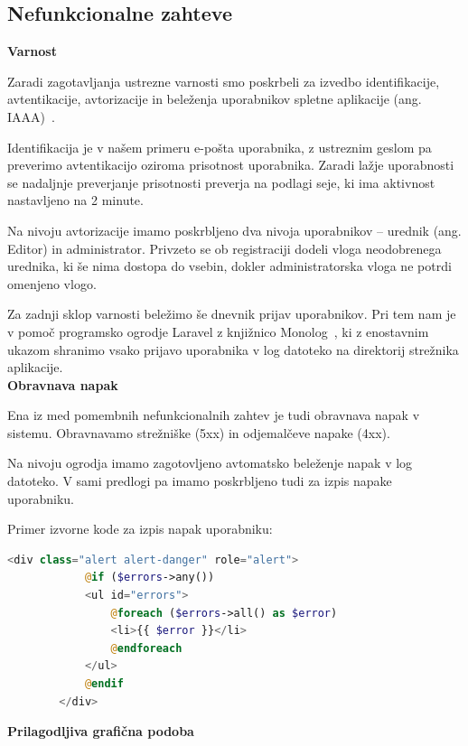 \documentclass[a4paper, 12pt]{book}
\begin{document}
\subsection{Nefunkcionalne zahteve}

\noindent \textbf{Varnost}

Zaradi zagotavljanja ustrezne varnosti smo poskrbeli za izvedbo identifikacije, avtentikacije, avtorizacije in beleženja uporabnikov spletne aplikacije (ang. IAAA)~\cite{IAAA-security}.

Identifikacija je v našem primeru e-pošta uporabnika, z ustreznim geslom pa preverimo avtentikacijo oziroma prisotnost uporabnika. Zaradi lažje uporabnosti se nadaljnje preverjanje prisotnosti preverja na podlagi seje, ki ima aktivnost nastavljeno na 2 minute. 

Na nivoju avtorizacije imamo poskrbljeno dva nivoja uporabnikov – urednik (ang. Editor) in administrator. Privzeto se ob registraciji dodeli vloga neodobrenega urednika, ki še nima dostopa do vsebin, dokler administratorska vloga ne potrdi omenjeno vlogo.

Za zadnji sklop varnosti beležimo še dnevnik prijav uporabnikov. Pri tem nam je v pomoč programsko ogrodje Laravel z knjižnico Monolog~\cite{laravel-monolog}, ki z enostavnim ukazom shranimo vsako prijavo uporabnika v log datoteko na direktorij strežnika aplikacije. \\

\noindent \textbf{Obravnava napak}

Ena iz med pomembnih nefunkcionalnih zahtev je tudi obravnava napak v sistemu. Obravnavamo strežniške (5xx) in odjemalčeve napake (4xx). 


Na nivoju ogrodja imamo zagotovljeno avtomatsko beleženje napak v log datoteko. V sami predlogi pa imamo poskrbljeno tudi za izpis napake uporabniku.

Primer izvorne kode za izpis napak uporabniku:

\begin{lstlisting}[language=PHP, style=mystyle]
        <div class="alert alert-danger" role="alert">
            @if ($errors->any())
            <ul id="errors">
                @foreach ($errors->all() as $error)
                <li>{{ $error }}</li>
                @endforeach
            </ul>
            @endif
        </div>
\end{lstlisting}

\vspace{5mm}

\noindent \textbf{Prilagodljiva grafična podoba}
\end{document}
